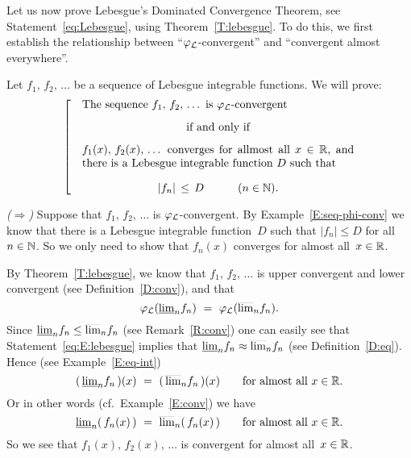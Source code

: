 \documentclass[main.tex]{subfiles}
\begin{document}
\begin{ex}
\label{E:lebesgue}
Let us now prove Lebesgue's Dominated Convergence Theorem,
 see Statement~\eqref{eq:Lebesgue}, 
using Theorem~\ref{T:lebesgue}.
To do this, we first establish the relationship between
``$\varphi_{\mathcal{L}}$-convergent'' and ``convergent almost everywhere''.

Let $f_1,\,f_2,\,\dotsc$ be a sequence of Lebesgue integrable functions.
We will prove:
\begin{equation}
\label{eq:E:lebesgue-0}
\left[\quad
\begin{minipage}{.7\columnwidth}
The sequence $f_1,\,f_2,\,\dotsc$
is $\Lphi$-convergent
\begin{center}
if and only if
\end{center}
 $f_1(x),\,f_2(x),\,\dotsc$ converges
for allmost all~$x\in \R$,
and
there is a Lebesgue integrable function~$D$
such that 
\begin{equation*}
|f_n|\,\leq\, D\qquad\quad(n\in\N).
\end{equation*}
\end{minipage}
\right.
\end{equation}

\vspace{.3em}
\emph{($\Longrightarrow$)}
Suppose that $f_1,\,f_2,\,\dotsc$
is $\varphi_{\mathcal{L}}$-convergent.
By Example~\ref{E:seq-phi-conv}
we know that there is a Lebesgue integrable function~$D$
such that $|f_n|\leq D$ for all~$n\in\mathbb{N}$.
So we only need to show that $f_n(x)$ 
converges for almost all~$x\in\mathbb{R}$.

By Theorem~\ref{T:lebesgue},
we know that $f_1,\,f_2,\,\dotsc$
is upper convergent and lower convergent
(see Definition~\ref{D:conv}),
and that 
\begin{equation}
\label{eq:E:lebesgue}
\varphi_{\mathcal{L}}(\smash{\underline{\lim}_{n}} f_n) \ =\  \varphi_{\mathcal{L}}(\smash{\overline{\lim}_{n}} f_n).
\end{equation}
Since $\smash{\underline{\lim}_{n}} f_n \leq \smash{\overline{\lim}_{n}} f_n$
(see Remark~\ref{R:conv})
one can easily see that Statement~\eqref{eq:E:lebesgue}
implies that 
 $\smash{\underline{\lim}_{n}} f_n \approx \smash{\overline{\lim}_{n}} f_n$
(see Definition~\ref{D:eq}).
Hence (see Example~\ref{E:eq-int})
\begin{equation*}
 (\,\smash{\underline{\lim}_{n}} f_n\,)(x) \ =\  (\,\smash{\overline{\lim}_{n}} f_n\,)(x)
\qquad\text{for almost all~$x\in \mathbb{R}$.}
\end{equation*}
Or in other words
(cf.~Example~\ref{E:conv}) we have
\begin{equation*}
 \smash{\underline{\lim}_{n}} (\,f_n(x)\,) \ =\  \smash{\overline{\lim}_{n}} (\,f_n(x)\,)
\qquad\text{for almost all~$x\in \mathbb{R}$.}
\end{equation*}
So we see that $f_1(x),\,f_2(x),\,\dotsc$
is convergent
for almost all~$x\in \mathbb{R}$.


\end{ex}
\end{document}
